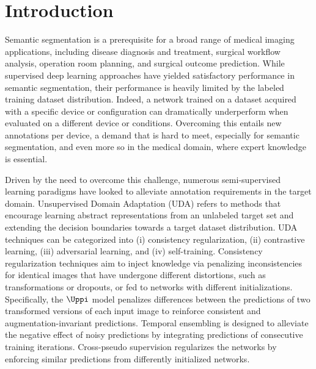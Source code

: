 \section{Introduction}
\label{sec:tist_introduction}

Semantic segmentation is a prerequisite for a broad range of medical imaging applications, including disease diagnosis and treatment, surgical workflow analysis, operation room planning, and surgical outcome prediction. While supervised deep learning approaches have yielded satisfactory performance in semantic segmentation, their performance is heavily limited by the labeled training dataset distribution. Indeed, a network trained on a dataset acquired with a specific device or configuration can dramatically underperform when evaluated on a different device or conditions. Overcoming this entails new annotations per device, a demand that is hard to meet, especially for semantic segmentation, and even more so in the medical domain, where expert knowledge is essential.

Driven by the need to overcome this challenge, numerous semi-supervised learning paradigms have looked to alleviate annotation requirements in the target domain. Unsupervised Domain Adaptation (UDA) refers to methods that encourage learning abstract representations from an unlabeled target set and extending the decision boundaries towards a target dataset distribution. UDA techniques can be categorized into (i) consistency regularization, (ii) contrastive learning, (iii) adversarial learning, and (iv) self-training. Consistency regularization techniques aim to inject knowledge via penalizing inconsistencies for identical images that have undergone different distortions, such as transformations or dropouts, or fed to networks with different initializations. Specifically, the $\Uppi$ model penalizes differences between the predictions of two transformed versions of each input image to reinforce consistent and augmentation-invariant predictions. Temporal ensembling is designed to alleviate the negative effect of noisy predictions by integrating predictions of consecutive training iterations. Cross-pseudo supervision regularizes the networks by enforcing similar predictions from differently initialized networks. 


